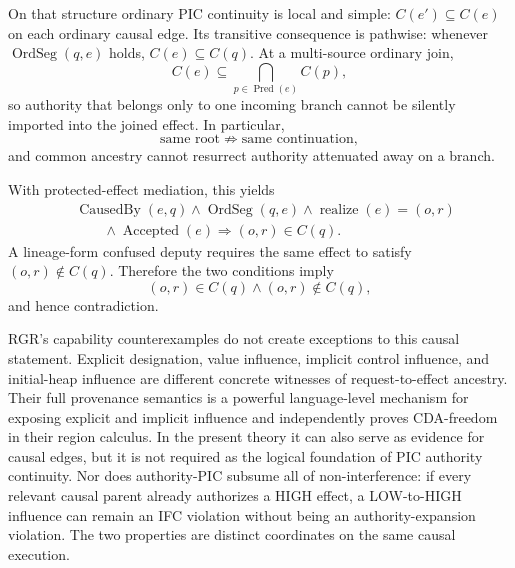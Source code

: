 \documentclass[10pt,twocolumn]{article}
\newcommand{\CausedBy}{\operatorname{CausedBy}}
\newcommand{\Realize}{\operatorname{realize}}
\newcommand{\Accepted}{\operatorname{Accepted}}
\newcommand{\OrdSeg}{\operatorname{OrdSeg}}
\newcommand{\Pred}{\operatorname{Pred}}
\begin{document}
On that structure ordinary PIC continuity is local and simple:
$C(e')\subseteq C(e)$ on each ordinary causal edge.  Its transitive consequence
is pathwise: whenever $\OrdSeg(q,e)$ holds, $C(e)\subseteq C(q)$.  At a
multi-source ordinary join,
\begin{equation}
  C(e)\subseteq\bigcap_{p\in\Pred(e)}C(p),
\end{equation}
so authority that belongs only to one incoming branch cannot be silently
imported into the joined effect.  In particular,
\begin{equation}
  \text{same root}\not\Rightarrow\text{same continuation},
\end{equation}
and common ancestry cannot resurrect authority attenuated away on a branch.

With protected-effect mediation, this yields
\begin{equation}
\begin{aligned}
  &\CausedBy(e,q)\land\OrdSeg(q,e)\land\Realize(e)=(o,r)\\
  &\qquad\land\Accepted(e)
  \Longrightarrow (o,r)\in C(q).
\end{aligned}
\end{equation}
A lineage-form confused deputy requires the same effect to satisfy
$(o,r)\notin C(q)$.  Therefore the two conditions imply
\begin{equation}
  (o,r)\in C(q)\land(o,r)\notin C(q),
\end{equation}
and hence contradiction.

RGR's capability counterexamples do not create exceptions to this causal
statement.  Explicit designation, value influence, implicit control influence,
and initial-heap influence are different concrete witnesses of request-to-effect
ancestry.  Their full provenance semantics is a powerful language-level
mechanism for exposing explicit and implicit influence and independently proves
CDA-freedom in their region calculus.  In the present theory it can also serve
as evidence for causal edges, but it is not required as the logical foundation
of PIC authority continuity.  Nor does authority-PIC subsume all of
non-interference: if every relevant causal parent already authorizes a HIGH
effect, a LOW-to-HIGH influence can remain an IFC violation without being an
authority-expansion violation.  The two properties are distinct coordinates on
the same causal execution.
\end{document}
